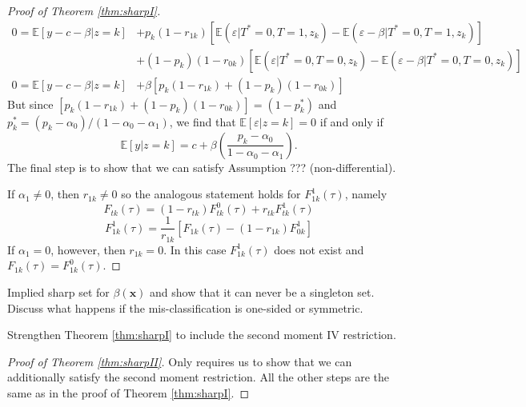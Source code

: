 \documentclass[12pt]{article}
\begin{document}
\begin{proof}[Proof of Theorem \ref{thm:sharpI}]
\begin{align*}
  0 = \mathbb{E}[y - c - \beta|z=k] &+ p_k(1 - r_{1k})\left[ \mathbb{E}(\varepsilon|T^*=0,T=1,z_k) - \mathbb{E}(\varepsilon - \beta|T^*=0,T=1,z_k) \right] \\
   &+ (1 - p_k)(1 - r_{0k})\left[ \mathbb{E}(\varepsilon|T^*=0,T=0,z_k) - \mathbb{E}(\varepsilon - \beta|T^*=0,T=0,z_k) \right]\\
   0 = \mathbb{E}[y - c - \beta|z=k] &+ \beta\left[p_k(1 - r_{1k}) + (1 - p_k)(1 - r_{0k})\right]
\end{align*}
But since $\left[p_k(1 - r_{1k}) + (1 - p_k)(1 - r_{0k})\right] = (1 - p_k^*)$ and $p_k^* = (p_k - \alpha_0) /(1 - \alpha_0 - \alpha_1)$, we find that $\mathbb{E}[\varepsilon|z=k] = 0$ if and only if 
\[
\mathbb{E}[y|z=k] = c + \beta\left( \frac{p_k - \alpha_0}{1 - \alpha_0 - \alpha_1} \right).
\]
The final step is to show that we can satisfy Assumption ??? (non-differential).


If $\alpha_1 \neq 0$, then $r_{1k}\neq 0$ so the analogous statement holds for $F_{1k}^1(\tau)$, namely
\[ 
  F_{tk}(\tau) = (1 - r_{tk}) F^{0}_{tk}(\tau) + r_{tk} F^{1}_{tk}(\tau)
\]
\[
  F^1_{1k}(\tau) = \frac{1}{r_{1k}}\left[F_{1k}(\tau) - (1 - r_{1k})F^1_{0k}\right]
\]
If $\alpha_1 = 0$, however, then $r_{1k} = 0$.
In this case $F^1_{1k}(\tau)$ does not exist and $F_{1k}(\tau) = F_{1k}^0(\tau)$.

\end{proof}


\begin{cor}
  Implied sharp set for $\beta(\mathbf{x})$ and show that it can never be a singleton set. Discuss what happens if the mis-classification is one-sided or symmetric.
\end{cor}

\begin{thm}
  \label{thm:sharpII}
  Strengthen Theorem \ref{thm:sharpI} to include the second moment IV restriction.
\end{thm}

\begin{proof}[Proof of Theorem \ref{thm:sharpII}]
Only requires us to show that we can additionally satisfy the second moment restriction.
All the other steps are the same as in the proof of Theorem \ref{thm:sharpI}.
\end{proof}
\end{document}
